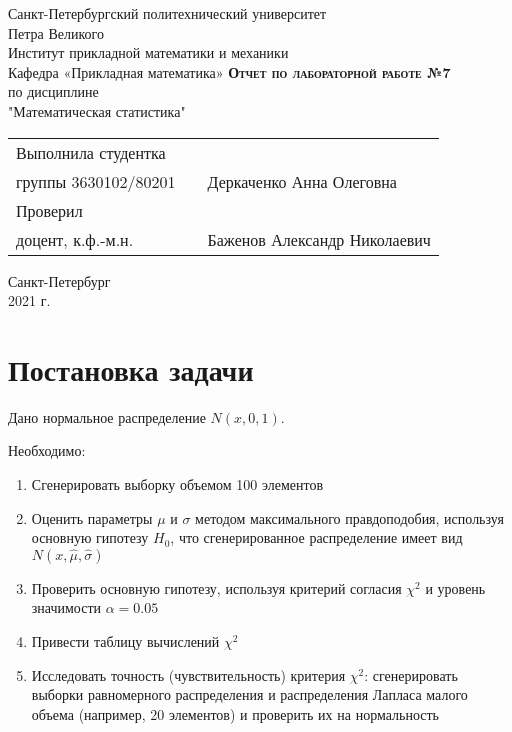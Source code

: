 \documentclass[12pt,a4paper]{article}
\begin{document}
    \begin{titlepage}
        \begin{center}
            \large
            Санкт-Петербургский политехнический университет\\Петра Великого\\
            \vspace{0.5cm}
            Институт прикладной математики и механики\\
            \vspace{0.25cm}
            Кафедра «Прикладная математика»
            \vfill
            \textsc{\LARGE\textbf{Отчет по лабораторной работе №7}}\\[5mm]
            \Large
            по дисциплине\\"Математическая статистика"
        \end{center}
        \vfill
        \begin{tabular}{l p{} l}
            Выполнила студентка\\группы 3630102/80201 && Деркаченко Анна Олеговна
            \vspace{0.25cm}
            \\Проверил\\доцент, к.ф.-м.н. && Баженов Александр Николаевич
        \end{tabular}
        \vfill
        \begin{center}
            Санкт-Петербург\\2021 г.
        \end{center}
    \end{titlepage}

\newpage
\begin{center}
    \tableofcontents
    \setcounter{page}{2}
\end{center}
\newpage
\begin{center}
    \listoffigures
\end{center}

\newpage
\section{Постановка задачи}
Дано нормальное распределение $N(x,0,1)$.

Необходимо:
\begin{enumerate}
    \item Сгенерировать выборку объемом 100 элементов
    \item Оценить параметры $\mu$ и $\sigma$ методом максимального правдоподобия, используя основную гипотезу $H_0$, что сгенерированное распределение имеет вид $N(x,\hat\mu,\hat\sigma)$
    \item Проверить основную гипотезу, используя критерий согласия $\chi^2$ и уровень значимости $\alpha=0.05$
    \item Привести таблицу вычислений $\chi^2$
    \item Исследовать точность (чувствительность) критерия $\chi^2$: сгенерировать выборки равномерного распределения и распределения Лапласа малого объема (например, 20 элементов) и проверить их на нормальность
\end{enumerate}
\end{document}
